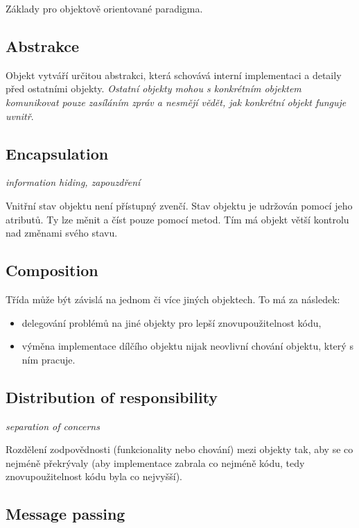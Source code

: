 \documentclass{szzclass}
\begin{document}
Základy pro objektově orientované paradigma.

\subsection{Abstrakce}

Objekt vytváří určitou abstrakci, která schovává interní implementaci a detaily před ostatními objekty.
\textit{Ostatní objekty mohou s konkrétním objektem komunikovat pouze zasíláním zpráv a nesmějí vědět,
jak konkrétní objekt funguje uvnitř}.

\subsection{Encapsulation}

\textit{information hiding, zapouzdření}

Vnitřní stav objektu není přístupný zvenčí. Stav objektu je udržován pomocí jeho atributů.
Ty lze měnit a číst pouze pomocí metod. Tím má objekt větší kontrolu nad změnami svého stavu.

\subsection{Composition}

Třída může být závislá na jednom či více jiných objektech. To má za následek:
\begin{itemize}
      \item delegování problémů na jiné objekty pro lepší znovupoužitelnost kódu,
      \item výměna implementace dílčího objektu nijak neovlivní chování objektu, který s ním pracuje.
\end{itemize}

\subsection{Distribution of responsibility}

\textit{separation of concerns}

Rozdělení zodpovědnosti (funkcionality nebo chování) mezi objekty tak, aby se co nejméně překrývaly
(aby implementace zabrala co nejméně kódu, tedy znovupoužitelnost kódu byla co nejvyšší).

\subsection{Message passing}
\end{document}
